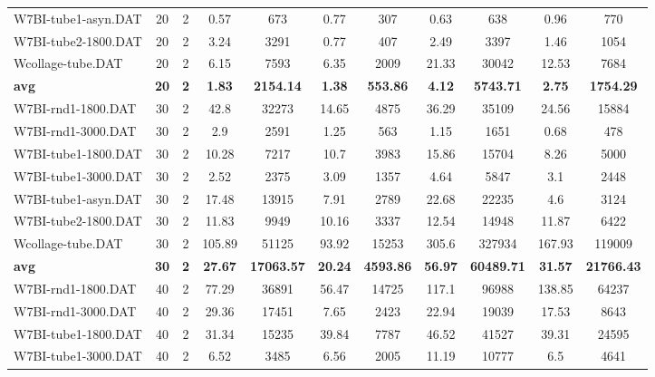 \begin{table}[!ht]
\begin{tabular}{lcccccccccc}
W7BI-tube1-asyn.DAT & 20 & 2 &  \textcolor{blue2}{0.57} & 673 & 0.77 & 307 & 0.63 & 638 & 0.96 & 770 \\
W7BI-tube2-1800.DAT & 20 & 2 & 3.24 & 3291 &  \textcolor{blue2}{0.77} & 407 & 2.49 & 3397 & 1.46 & 1054 \\
Wcollage-tube.DAT & 20 & 2 &  \textcolor{blue2}{6.15} & 7593 & 6.35 & 2009 & 21.33 & 30042 & 12.53 & 7684 \\
\cline{1-11} \textbf{avg} & \textbf{20} & \textbf{2} & \textbf{1.83} & \textbf{2154.14} & \textbf{1.38} & \textbf{553.86} & \textbf{4.12} & \textbf{5743.71} & \textbf{2.75} & \textbf{1754.29} \\ \cline{1-11}
W7BI-rnd1-1800.DAT & 30 & 2 & 42.8 & 32273 &  \textcolor{blue2}{14.65} & 4875 & 36.29 & 35109 & 24.56 & 15884 \\
W7BI-rnd1-3000.DAT & 30 & 2 & 2.9 & 2591 & 1.25 & 563 & 1.15 & 1651 &  \textcolor{blue2}{0.68} & 478 \\
W7BI-tube1-1800.DAT & 30 & 2 & 10.28 & 7217 & 10.7 & 3983 & 15.86 & 15704 &  \textcolor{blue2}{8.26} & 5000 \\
W7BI-tube1-3000.DAT & 30 & 2 &  \textcolor{blue2}{2.52} & 2375 & 3.09 & 1357 & 4.64 & 5847 & 3.1 & 2448 \\
W7BI-tube1-asyn.DAT & 30 & 2 & 17.48 & 13915 & 7.91 & 2789 & 22.68 & 22235 &  \textcolor{blue2}{4.6} & 3124 \\
W7BI-tube2-1800.DAT & 30 & 2 & 11.83 & 9949 &  \textcolor{blue2}{10.16} & 3337 & 12.54 & 14948 & 11.87 & 6422 \\
Wcollage-tube.DAT & 30 & 2 & 105.89 & 51125 &  \textcolor{blue2}{93.92} & 15253 & 305.6 & 327934 & 167.93 & 119009 \\
\cline{1-11} \textbf{avg} & \textbf{30} & \textbf{2} & \textbf{27.67} & \textbf{17063.57} & \textbf{20.24} & \textbf{4593.86} & \textbf{56.97} & \textbf{60489.71} & \textbf{31.57} & \textbf{21766.43} \\ \cline{1-11}
W7BI-rnd1-1800.DAT & 40 & 2 & 77.29 & 36891 &  \textcolor{blue2}{56.47} & 14725 & 117.1 & 96988 & 138.85 & 64237 \\
W7BI-rnd1-3000.DAT & 40 & 2 & 29.36 & 17451 &  \textcolor{blue2}{7.65} & 2423 & 22.94 & 19039 & 17.53 & 8643 \\
W7BI-tube1-1800.DAT & 40 & 2 &  \textcolor{blue2}{31.34} & 15235 & 39.84 & 7787 & 46.52 & 41527 & 39.31 & 24595 \\
W7BI-tube1-3000.DAT & 40 & 2 & 6.52 & 3485 & 6.56 & 2005 & 11.19 & 10777 &  \textcolor{blue2}{6.5} & 4641 \\

\end{tabular}
\end{table}

